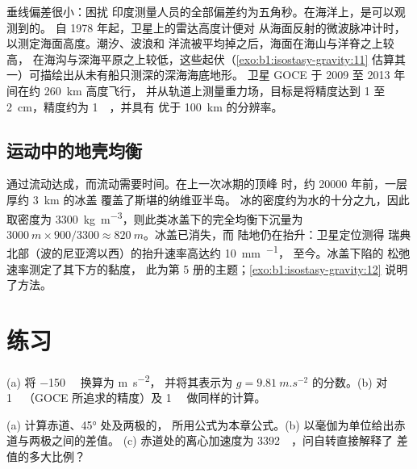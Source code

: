 垂线偏差很小：困扰
印度测量人员的全部偏差约为五角秒。在海洋上，是可以观测到的。
自 1978 年起，卫星上的雷达高度计便对
从海面反射的微波脉冲计时，以测定海面高度。潮汐、波浪和
洋流被平均掉之后，海面在海山与洋脊之上较高，
在海沟与深海平原之上较低，这些起伏（\cref{exo:b1:isostasy-gravity:11}
估算其一）可描绘出从未有船只测深的深海海底地形。
卫星 GOCE 于 2009 至 2013 年间在约 \qty{260}{km} 高度飞行，
并从轨道上测量重力场，目标是将精度达到 1 至
\qty{2}{cm}，精度约为 \qty{1}{\milli\gal}，并具有
优于 \qty{100}{km} 的分辨率。

\subsection*{运动中的地壳均衡}

通过流动达成，而流动需要时间。在上一次冰期的顶峰
时，约 \num{20000} 年前，一层厚约 \qty{3}{km} 的冰盖
覆盖了斯堪的纳维亚半岛。
冰的密度约为水的十分之九，因此取密度为
\qty{3300}{kg.m^{-3}}，则此类冰盖下的完全均衡下沉量为
$\qty{3000}{m}\times900/3300 \approx \qty{820}{m}$。冰盖已消失，而
陆地仍在抬升：卫星定位测得
瑞典北部（波的尼亚湾以西）的抬升速率高达约 \qty{10}{mm.^{-1}}，
至今。冰盖下陷的
松弛速率测定了其下方的黏度，
此为第 5 册的主题；\cref{exo:b1:isostasy-gravity:12} 说明了方法。

\section{练习}

\begin{exercise}[$\star$]\label{exo:b1:isostasy-gravity:1}
(a) 将 \qty{-150}{\milli\gal} 换算为 \unit{m.s^{-2}}，
并将其表示为 $g = \qty{9.81}{m.s^{-2}}$ 的分数。(b) 对
\qty{1}{\milli\gal}（GOCE 所追求的精度）及
\qty{1}{\micro\gal} 做同样的计算。
\end{exercise}

\begin{exercise}[$\star$]\label{exo:b1:isostasy-gravity:2}
(a) 计算赤道、\ang{45} 处及两极的，
所用公式为本章公式。(b) 以毫伽为单位给出赤道与两极之间的差值。
(c) 赤道处的离心加速度为
\qty{3392}{\milli\gal}，问自转直接解释了
差值的多大比例？
\end{exercise}

